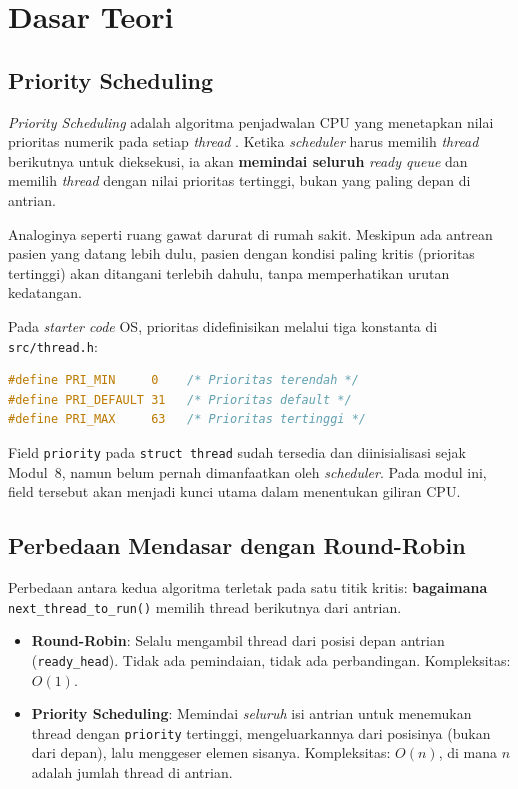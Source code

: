 \newpage
\section{Dasar Teori}

\subsection{Priority Scheduling}
\textit{Priority Scheduling} adalah algoritma penjadwalan CPU yang menetapkan nilai prioritas numerik pada setiap \textit{thread} \cite{Silberschatz2018}. Ketika \textit{scheduler} harus memilih \textit{thread} berikutnya untuk dieksekusi, ia akan \textbf{memindai seluruh} \textit{ready queue} dan memilih \textit{thread} dengan nilai prioritas tertinggi, bukan yang paling depan di antrian.

Analoginya seperti ruang gawat darurat di rumah sakit. Meskipun ada antrean pasien yang datang lebih dulu, pasien dengan kondisi paling kritis (prioritas tertinggi) akan ditangani terlebih dahulu, tanpa memperhatikan urutan kedatangan.

Pada \textit{starter code} OS, prioritas didefinisikan melalui tiga konstanta di \texttt{src/thread.h}:

\begin{lstlisting}[language=C, caption={Konstanta prioritas pada thread.h}]
#define PRI_MIN     0    /* Prioritas terendah */
#define PRI_DEFAULT 31   /* Prioritas default */
#define PRI_MAX     63   /* Prioritas tertinggi */
\end{lstlisting}

Field \texttt{priority} pada \texttt{struct thread} sudah tersedia dan diinisialisasi sejak Modul~8, namun belum pernah dimanfaatkan oleh \textit{scheduler}. Pada modul ini, field tersebut akan menjadi kunci utama dalam menentukan giliran CPU.

\subsection{Perbedaan Mendasar dengan Round-Robin}
Perbedaan antara kedua algoritma terletak pada satu titik kritis: \textbf{bagaimana} \texttt{next\_thread\_to\_run()} memilih thread berikutnya dari antrian.

\begin{itemize}
	\item \textbf{Round-Robin}: Selalu mengambil thread dari posisi depan antrian (\texttt{ready\_head}). Tidak ada pemindaian, tidak ada perbandingan. Kompleksitas: $O(1)$.
	\item \textbf{Priority Scheduling}: Memindai \textit{seluruh} isi antrian untuk menemukan thread dengan \texttt{priority} tertinggi, mengeluarkannya dari posisinya (bukan dari depan), lalu menggeser elemen sisanya. Kompleksitas: $O(n)$, di mana $n$ adalah jumlah thread di antrian.
\end{itemize}

